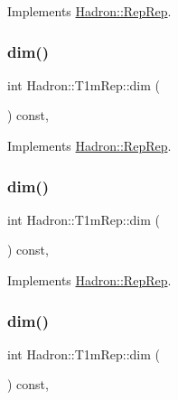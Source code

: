 Implements \mbox{\hyperlink{structHadron_1_1RepRep_a92c8802e5ed7afd7da43ccfd5b7cd92b}{Hadron\+::\+Rep\+Rep}}.

\mbox{\label{structHadron_1_1T1mRep_a6752f30731a94469c77ea15a78ddf9d9}} 
\subsubsection{\texorpdfstring{dim()}{dim()}\hspace{0.1cm}{\footnotesize\ttfamily [3/5]}}
{\footnotesize\ttfamily int Hadron\+::\+T1m\+Rep\+::dim (\begin{DoxyParamCaption}{ }\end{DoxyParamCaption}) const\hspace{0.3cm}{\ttfamily [inline]}, {\ttfamily [virtual]}}



Implements \mbox{\hyperlink{structHadron_1_1RepRep_a92c8802e5ed7afd7da43ccfd5b7cd92b}{Hadron\+::\+Rep\+Rep}}.

\mbox{\label{structHadron_1_1T1mRep_a6752f30731a94469c77ea15a78ddf9d9}} 
\subsubsection{\texorpdfstring{dim()}{dim()}\hspace{0.1cm}{\footnotesize\ttfamily [4/5]}}
{\footnotesize\ttfamily int Hadron\+::\+T1m\+Rep\+::dim (\begin{DoxyParamCaption}{ }\end{DoxyParamCaption}) const\hspace{0.3cm}{\ttfamily [inline]}, {\ttfamily [virtual]}}



Implements \mbox{\hyperlink{structHadron_1_1RepRep_a92c8802e5ed7afd7da43ccfd5b7cd92b}{Hadron\+::\+Rep\+Rep}}.

\mbox{\label{structHadron_1_1T1mRep_a6752f30731a94469c77ea15a78ddf9d9}} 
\subsubsection{\texorpdfstring{dim()}{dim()}\hspace{0.1cm}{\footnotesize\ttfamily [5/5]}}
{\footnotesize\ttfamily int Hadron\+::\+T1m\+Rep\+::dim (\begin{DoxyParamCaption}{ }\end{DoxyParamCaption}) const\hspace{0.3cm}{\ttfamily [inline]}, {\ttfamily [virtual]}}



